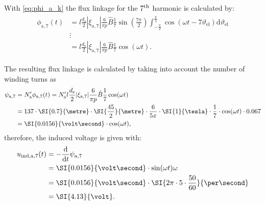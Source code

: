 \begin{solutionblock}
    With \eqref{eq:phi_a_k} the flux linkage for the $7\textsuperscript{th}$ harmonic is calculated by:
    \begin{align}
        \begin{split}
            \phi_{\mathrm{a,}7}(t) & = l \frac{d_{\mathrm{s}}}{2} |\xi_{\mathrm{a},7}|
            \frac{6}{\pi p} \hat{B}\frac{1}{7} \sin\left(\frac{7\pi}{2}\right) \int_{-\frac{\pi}{2}}^{\frac{\pi}{2}} \cos(\omega t - 7\vartheta_{\mathrm{el}}) \mathrm{d}\vartheta_{\mathrm{el}} \\
                                   & \vdots                                                                                                                                                      \\
                                   & = l \frac{d_{\mathrm{s}}}{2} |\xi_{\mathrm{a},7}|
            \frac{6}{\pi p} \hat{B} \frac{1}{7} \cos(\omega t).
        \end{split}
    \end{align}

    The resulting flux linkage is calculated by taking into account the number of winding turns as
    \begin{align}
        \begin{split}
            \psi_{\mathrm{a,}7} & = N_{\mathrm{a}}' \phi_{\mathrm{a,}7}(t)
            = N_{\mathrm{a}}' l \frac{d_{\mathrm{s}}}{2} |\xi_{\mathrm{a},7}| \frac{6}{\pi p} \hat{B} \frac{1}{7} \cos(\omega t)                                                            \\
                                & = 137 \cdot \SI{0.7}{\metre} \cdot \SI{\frac{45}{2}}{\metre} \cdot \frac{6}{5\pi} \cdot \SI{1}{\tesla} \cdot \frac{1}{7} \cdot \cos(\omega t) \cdot 0.067 \\
                                & = \SI{0.0156}{\volt\second} \cdot \cos(\omega t),
        \end{split}
    \end{align}
    therefore, the induced voltage is given with:
    \begin{align}
        \begin{split}
            u_{\mathrm{ind,a,}7}(t) & = -\frac{\mathrm{d}}{\mathrm{d}t}\psi_{\mathrm{a,}7}                               \\
                                    & = \SI{0.0156}{\volt\second} \cdot \sin(\omega t) \omega                            \\
                                    & = \SI{0.0156}{\volt\second} \cdot \SI{2\pi\cdot 5\cdot \frac{50}{60}}{\per\second} \\
                                    & = \SI{4.13}{\volt}.
        \end{split}
    \end{align}

\end{solutionblock}


